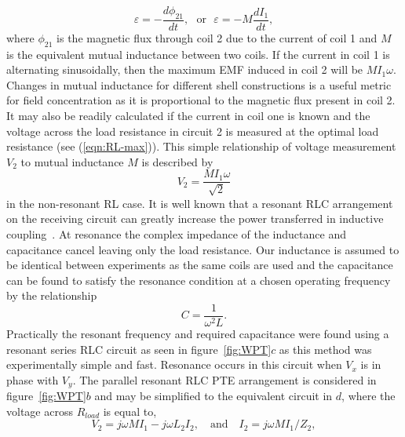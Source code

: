 \documentclass[11pt]{iopart}
\begin{document}
\begin{equation}
  \varepsilon = -\frac{d\phi_{21}}{dt},~~~\text{or}~~~\varepsilon = -M\frac{dI_{1}}{dt},
  \label{eqn:M}
\end{equation}
\vspace{-0.2em}
where $\phi_{21}$ is the magnetic flux through coil 2 due to the
current of coil 1 and $M$ is the equivalent mutual inductance between
two coils.
If the current in coil 1 is alternating sinusoidally, then the
maximum EMF induced in coil 2 will be $M I_1 \omega$. Changes in
mutual inductance for different shell constructions is a useful metric
for field concentration as it is proportional to the magnetic flux
present in coil 2. It may also be readily calculated if the current in
coil one is known and the voltage across the load resistance in
circuit 2 is measured at the optimal load resistance
(see (\ref{eqn:RL-max})). This simple relationship of voltage
measurement $V_2$ to mutual inductance $M$ is described by
\vspace{-0.2em}
\begin{equation}
  V_2 = \frac{MI_1\omega}{\sqrt{2}}
\label{eqn:MVs}
\end{equation}
\vspace{-0.2em}
in the non-resonant RL case.
It is well known that a resonant RLC arrangement on the receiving
circuit can greatly increase the power transferred in inductive
coupling~\cite{Hirai2000}.  At resonance the complex impedance of the inductance
and capacitance cancel leaving only the load resistance. Our
inductance is assumed to be identical between experiments as the same
coils are used and the capacitance can be found to satisfy the
resonance condition at a chosen operating frequency by the
relationship
\vspace{-0.4em}
\begin{equation}
  C = \frac{1}{\omega^2L}.
  \label{eqn:RLC-res}
\end{equation}
\vspace{-0.3em}
Practically the resonant frequency and required capacitance were found
using a resonant series RLC circuit as seen in
figure~\ref{fig:WPT}$c$ as this method was experimentally
simple and fast. Resonance occurs in this circuit when $V_x$ is in phase with
$V_y$.
The parallel resonant RLC PTE arrangement is considered in
figure~\ref{fig:WPT}$b$ and may be simplified to the equivalent
circuit in $d$, where the voltage across $R_{load}$ is equal to,
\vspace{-0.2em}
\begin{equation}
 V_2 = j\omega MI_1 - j\omega L_2I_2,\quad\text{and}\quad
 I_2 = j\omega MI_1 / Z_2 ,
\end{equation}
\end{document}
